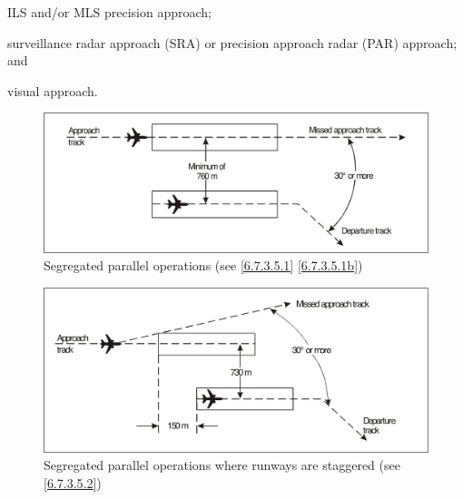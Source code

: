 \documentclass[../main.tex]{subfiles}
\begin{document}
\begin{enumerate}[itemsep=0.2cm]
\begin{enumerate}
            \begin{enumalph}
                \item ILS and/or MLS precision approach;
                \item surveillance radar approach (SRA) or precision approach radar (PAR) approach; and
                \item visual approach.
            \end{enumalph}

        \end{enumerate}
    \end{enumerate}

    \chapterend

    \begin{figure}[!ht]
        \centering
        \includegraphics[width=14cm]{Images/Fig 6-1.png}
        \caption[Segregated parallel operations]{Segregated parallel operations (see \ref{6.7.3.5.1} \ref{6.7.3.5.1b})}
        \label{fig:6-1}
    \end{figure}

    \vfill
    \begin{figure}[!ht]
        \centering
        \includegraphics[width=14cm]{Images/Fig 6-2.png}
        \caption[Segregated parallel operations where runways are staggered]{Segregated parallel operations where runways are staggered (see \ref{6.7.3.5.2})}
        \label{fig:6-2}
    \end{figure}
\end{document}
